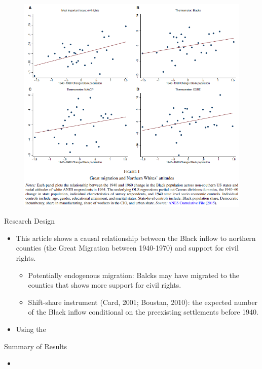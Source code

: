\documentclass[dvipdfmx,11pt]{beamer}
\begin{document}
\begin{frame}{}
  \begin{figure}
    \centering
    \includegraphics[scale = .45]{fig_tab/os20220708/F1.png}
  \end{figure}
\end{frame}

\begin{frame}{Research Design}
  \begin{itemize}
    \item This article shows a causal relationship between the Black inflow to northern counties (the Great Migration between 1940-1970) and support for civil rights.
    \begin{itemize}
      \item Potentially endogenous migration: Balcks may have migrated to the counties that shows more support for civil rights.
      \item Shift-share instrument (Card, 2001; Boustan, 2010): the expected number of the Black inflow conditional on the preexisting settlements before 1940.
    \end{itemize}
    \item Using the %
  \end{itemize}
\end{frame}

\begin{frame}{Summary of Results}
  \begin{itemize}
    \item 
  \end{itemize}
\end{frame}
\end{document}
